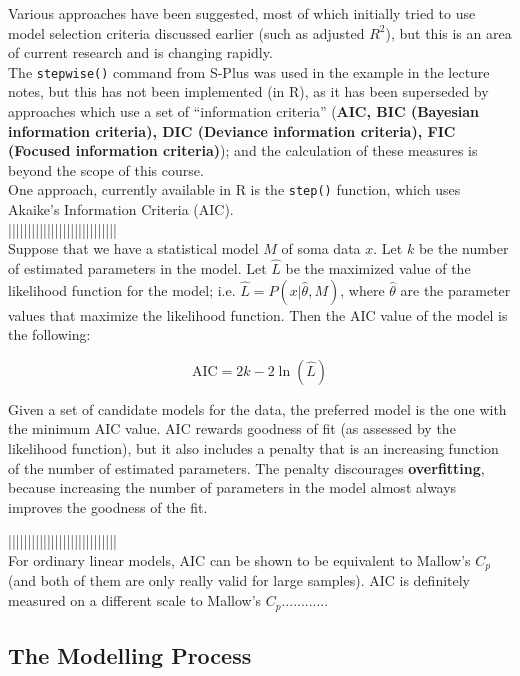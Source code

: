 \documentclass[a4paper, 11pt, twoside]{article}
\begin{document}
Various approaches have been suggested, most of which initially tried to use model selection criteria discussed earlier (such as adjusted $R^2$), but this is an area of current research and is changing rapidly.\\

The \texttt{stepwise()} command from S-Plus was used in the example in the lecture notes, but this has not been implemented (in R), as it has been superseded by approaches which use a set of ``information criteria'' (\textbf{AIC, BIC (Bayesian information criteria), DIC (Deviance information criteria), FIC (Focused information criteria)}); and the calculation of these measures is beyond the scope of this course.\\

One approach, currently available in R is the \texttt{step()} function, which uses Akaike's Information Criteria (AIC).\\

||||||||||||||||||||||||||||\\


Suppose that we have a statistical model $M$ of soma data $x$. Let $k$ be the number of estimated parameters in the model. Let $\hat{L}$ be the maximized value of the likelihood function for the model; i.e. $\hat{L}=P(x|\hat{\theta}, M)$, where $\hat{\theta}$ are the parameter values that maximize the likelihood function. Then the AIC value of the model is the following:

\[\text{AIC} = 2k - 2\ln(\hat{L})\]

Given a set of candidate models for the data, the preferred model is the one with the minimum AIC value. AIC rewards goodness of fit (as assessed by the likelihood function), but it also includes a penalty that is an increasing function of the number of estimated parameters. The penalty discourages \textbf{overfitting}, because increasing the number of parameters in the model almost always improves the goodness of the fit.

||||||||||||||||||||||||||||\\


For ordinary linear models, AIC can be shown to be equivalent to Mallow's $C_p$ (and both of them are only really valid for large samples). AIC is definitely measured on a different scale to Mallow's $C_p$............\\

\subsection{The Modelling Process}\ 
\end{document}
